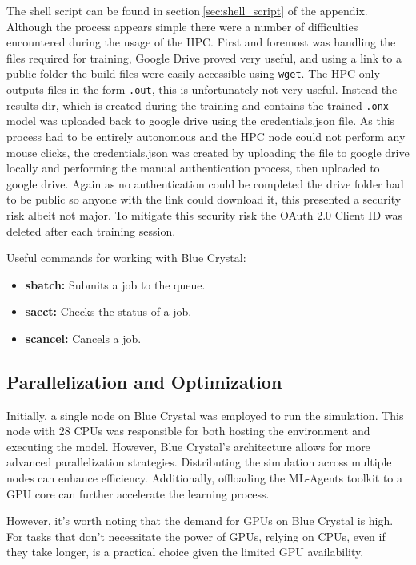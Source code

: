 The shell script can be found in section$~$\ref{sec:shell_script} of the appendix. Although the process appears simple there were a number of difficulties encountered during the usage of the HPC. First and foremost was handling the files required for training, Google Drive proved very useful, and using a link to a public folder the build files were easily accessible using \texttt{wget}. The HPC only outputs files in the form \texttt{.out}, this is unfortunately not very useful. Instead the results dir, which is created during the training and contains the trained \texttt{.onx} model was uploaded back to google drive using the credentials.json file. As this process had to be entirely autonomous and the HPC node could not perform any mouse clicks, the credentials.json was created by uploading the file to google drive locally and performing the manual authentication process, then uploaded to google drive. Again as no authentication could be completed the drive folder had to be public so anyone with the link could download it, this presented a security risk albeit not major. To mitigate this security risk the OAuth 2.0 Client ID was deleted after each training session.

Useful commands for working with Blue Crystal:

\begin{itemize}
    \item \textbf{sbatch:} Submits a job to the queue.
    \item \textbf{sacct:} Checks the status of a job.
    \item \textbf{scancel:} Cancels a job.
\end{itemize}

\subsection*{Parallelization and Optimization}

Initially, a single node on Blue Crystal was employed to run the simulation. This node with 28 CPUs was responsible for both hosting the environment and executing the model. However, Blue Crystal's architecture allows for more advanced parallelization strategies. Distributing the simulation across multiple nodes can enhance efficiency. Additionally, offloading the ML-Agents toolkit to a GPU core can further accelerate the learning process.

However, it's worth noting that the demand for GPUs on Blue Crystal is high. For tasks that don't necessitate the power of GPUs, relying on CPUs, even if they take longer, is a practical choice given the limited GPU availability.



